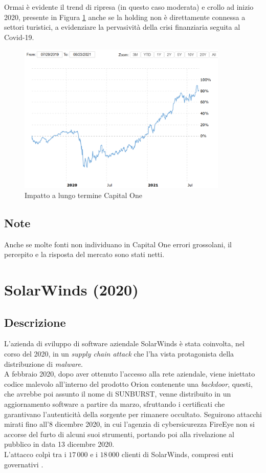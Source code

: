 \documentclass[12pt,a4paper,twoside]{report}
\begin{document}
Ormai \`e evidente il trend di ripresa (in questo caso moderata) e crollo ad inizio 2020, presente in Figura \ref{fig:cpto2} \cite{macrotrends_capitalone} anche se la holding non \`e direttamente connessa a settori turistici, a evidenziare la pervasivit\`a della crisi finanziaria seguita al Covid-19.\\

\begin{figure}[H] 
\begin{center} 
\includegraphics[width=10cm]{figures/CapitalOne_long.png} 
\caption[Grafico Capital One long]{Impatto a lungo termine  Capital One}\label{fig:cpto2}
\end{center}
\end{figure}
\subsection{Note}
Anche se molte fonti non individuano in Capital One errori grossolani, il percepito e la risposta del mercato sono stati netti.\\
\section{SolarWinds (2020)}
\subsection{Descrizione}
L'azienda di sviluppo di software aziendale SolarWinds \`e stata coinvolta, nel corso del 2020, in un \textit{supply chain attack} che l'ha vista protagonista della distribuzione di \textit{malware}.\\
A febbraio 2020, dopo aver ottenuto l'accesso alla rete aziendale, viene iniettato codice malevolo all'interno del prodotto Orion contenente una \textit{backdoor}, questi, che avrebbe poi assunto il nome di SUNBURST, venne distribuito in un aggiornamento software a partire da marzo, sfruttando i certificati che garantivano l'autenticit\`a della sorgente per rimanere occultato. Seguirono attacchi mirati fino all'8 dicembre 2020, in cui l'agenzia di cybersicurezza FireEye non si accorse del furto di alcuni suoi strumenti, portando poi alla rivelazione al pubblico in data 13 dicembre 2020.\\
L'attacco colp\`i tra i $17\,000$ e i $18\,000$ clienti di SolarWinds, compresi enti governativi \cite{SolarWinds_lessons}\cite{SolarWinds_analysis}\cite{SolarWinds_conference}.\\
\end{document}
